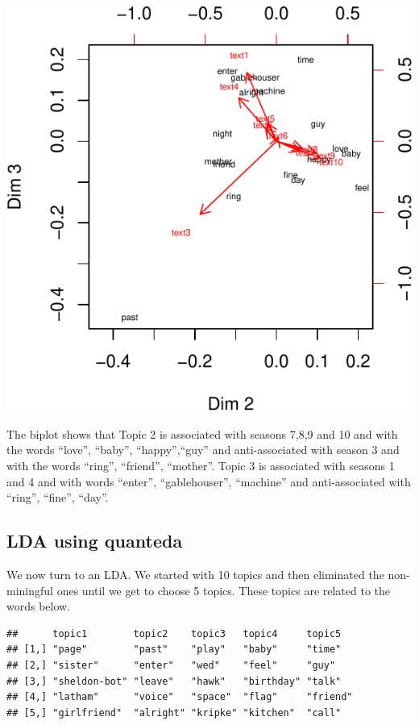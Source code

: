 \documentclass[
]{article}
\begin{document}
\includegraphics{report_files/figure-latex/unnamed-chunk-59-1.pdf}

The biplot shows that Topic 2 is associated with seasons 7,8,9 and 10
and with the words ``love'', ``baby'', ``happy'',``guy'' and
anti-associated with season 3 and with the words ``ring'', ``friend'',
``mother''. Topic 3 is associated with seasons 1 and 4 and with words
``enter'', ``gablehouser'', ``machine'' and anti-associated with
``ring'', ``fine'', ``day''.

\hypertarget{lda-using-quanteda}{%
\subsection{LDA using quanteda}\label{lda-using-quanteda}}

We now turn to an LDA. We started with 10 topics and then eliminated the
non-miningful ones until we get to choose 5 topics. These topics are
related to the words below.

\begin{verbatim}
##      topic1        topic2    topic3   topic4     topic5  
## [1,] "page"        "past"    "play"   "baby"     "time"  
## [2,] "sister"      "enter"   "wed"    "feel"     "guy"   
## [3,] "sheldon-bot" "leave"   "hawk"   "birthday" "talk"  
## [4,] "latham"      "voice"   "space"  "flag"     "friend"
## [5,] "girlfriend"  "alright" "kripke" "kitchen"  "call"
\end{verbatim}
\end{document}
